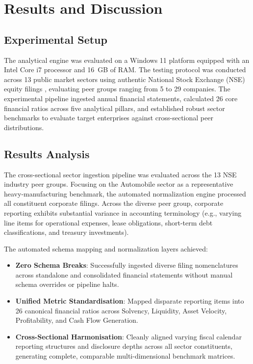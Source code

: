 \chapter{Results and Discussion}
\label{ch:results}

\section{Experimental Setup}
The analytical engine was evaluated on a Windows 11 platform equipped with an Intel Core i7 processor and 16~GB of RAM. The testing protocol was conducted across 13 public market sectors using authentic National Stock Exchange (NSE) equity filings \cite{nseindia}, evaluating peer groups ranging from 5 to 29 companies. The experimental pipeline ingested annual financial statements, calculated 26 core financial ratios across five analytical pillars, and established robust sector benchmarks to evaluate target enterprises against cross-sectional peer distributions.

\section{Results Analysis}
The cross-sectional sector ingestion pipeline was evaluated across the 13 NSE industry peer groups. Focusing on the Automobile sector as a representative heavy-manufacturing benchmark, the automated normalization engine processed all constituent corporate filings. Across the diverse peer group, corporate reporting exhibits substantial variance in accounting terminology (e.g., varying line items for operational expenses, lease obligations, short-term debt classifications, and treasury investments).

The automated schema mapping and normalization layers achieved:
\begin{itemize}
    \item \textbf{Zero Schema Breaks}: Successfully ingested diverse filing nomenclatures across standalone and consolidated financial statements without manual schema overrides or pipeline halts.
    \item \textbf{Unified Metric Standardisation}: Mapped disparate reporting items into 26 canonical financial ratios across Solvency, Liquidity, Asset Velocity, Profitability, and Cash Flow Generation.
    \item \textbf{Cross-Sectional Harmonisation}: Cleanly aligned varying fiscal calendar reporting structures and disclosure depths across all sector constituents, generating complete, comparable multi-dimensional benchmark matrices.
\end{itemize}

